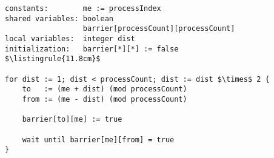 \begin{minipage}
\centering
\begin{lstlisting}[mathescape, linewidth=11.8cm]
constants:        me := processIndex
shared variables: boolean
                  barrier[processCount][processCount]
local variables:  integer dist
initialization:   barrier[*][*] := false
$\listingrule{11.8cm}$

for dist := 1; dist < processCount; dist := dist $\times$ 2 {
	to   := (me + dist) (mod processCount)
	from := (me - dist) (mod processCount)
	
	barrier[to][me] := true
	
	wait until barrier[me][from] = true
}
\end{lstlisting}
\end{minipage}
